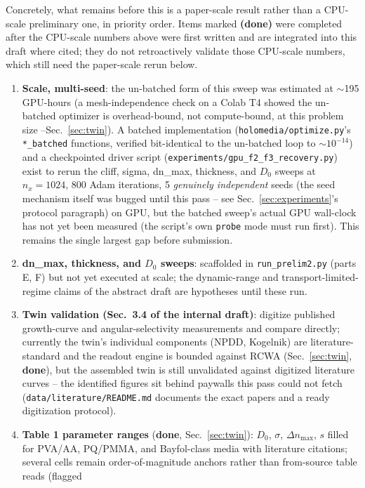 \documentclass[conference]{IEEEtran}
\begin{document}
Concretely, what remains before this is a paper-scale result rather than a
CPU-scale preliminary one, in priority order. Items marked \textbf{(done)}
were completed after the CPU-scale numbers above were first written and are
integrated into this draft where cited; they do not retroactively validate
those CPU-scale numbers, which still need the paper-scale rerun below.
\begin{enumerate}
\item \textbf{Scale, multi-seed}: the un-batched form of this sweep was
estimated at $\sim$195 GPU-hours (a mesh-independence check on a Colab T4
showed the un-batched optimizer is overhead-bound, not compute-bound, at
this problem size --Sec.~\ref{sec:twin}). A batched implementation
(\texttt{holomedia/optimize.py}'s \texttt{*\_batched} functions, verified
bit-identical to the un-batched loop to $\sim10^{-14}$) and a checkpointed
driver script (\texttt{experiments/gpu\_f2\_f3\_recovery.py}) exist to rerun
the cliff, sigma, dn\_max, thickness, and $D_0$ sweeps at $n_x = 1024$,
800 Adam iterations, 5 \emph{genuinely independent} seeds (the seed
mechanism itself was bugged until this pass -- see Sec.~\ref{sec:experiments}'s
protocol paragraph) on GPU, but the batched sweep's actual GPU wall-clock has
not yet been measured (the script's own \texttt{probe} mode must run first).
This remains the single largest gap before submission.
\item \textbf{dn\_max, thickness, and $D_0$ sweeps}: scaffolded in
\texttt{run\_prelim2.py} (parts E, F) but not yet executed at scale; the
dynamic-range and transport-limited-regime claims of the abstract draft are
hypotheses until these run.
\item \textbf{Twin validation (Sec.~3.4 of the internal draft)}: digitize
published growth-curve and angular-selectivity measurements and compare
directly; currently the twin's individual components (NPDD, Kogelnik) are
literature-standard and the readout engine is bounded against RCWA
(Sec.~\ref{sec:twin}, \textbf{done}), but the assembled twin is still
unvalidated against digitized literature curves -- the identified figures sit
behind paywalls this pass could not fetch (\texttt{data/literature/README.md}
documents the exact papers and a ready digitization protocol).
\item \textbf{Table 1 parameter ranges} (\textbf{done}, Sec.~\ref{sec:twin}):
$D_0$, $\sigma$, $\Delta n_{\max}$, $s$ filled for PVA/AA, PQ/PMMA, and
Bayfol-class media with literature citations; several cells remain
order-of-magnitude anchors rather than from-source table reads (flagged

\end{enumerate}
\end{document}
